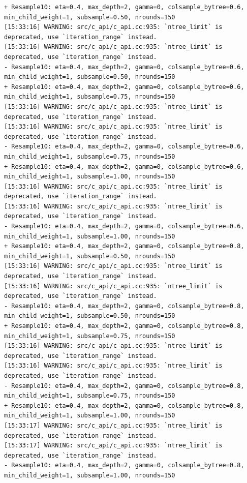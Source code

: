 \documentclass[
  letterpaper,
  DIV=11,
  numbers=noendperiod]{scrartcl}
\begin{document}
\begin{verbatim}
+ Resample10: eta=0.4, max_depth=2, gamma=0, colsample_bytree=0.6, min_child_weight=1, subsample=0.50, nrounds=150 
[15:33:16] WARNING: src/c_api/c_api.cc:935: `ntree_limit` is deprecated, use `iteration_range` instead.
[15:33:16] WARNING: src/c_api/c_api.cc:935: `ntree_limit` is deprecated, use `iteration_range` instead.
- Resample10: eta=0.4, max_depth=2, gamma=0, colsample_bytree=0.6, min_child_weight=1, subsample=0.50, nrounds=150 
+ Resample10: eta=0.4, max_depth=2, gamma=0, colsample_bytree=0.6, min_child_weight=1, subsample=0.75, nrounds=150 
[15:33:16] WARNING: src/c_api/c_api.cc:935: `ntree_limit` is deprecated, use `iteration_range` instead.
[15:33:16] WARNING: src/c_api/c_api.cc:935: `ntree_limit` is deprecated, use `iteration_range` instead.
- Resample10: eta=0.4, max_depth=2, gamma=0, colsample_bytree=0.6, min_child_weight=1, subsample=0.75, nrounds=150 
+ Resample10: eta=0.4, max_depth=2, gamma=0, colsample_bytree=0.6, min_child_weight=1, subsample=1.00, nrounds=150 
[15:33:16] WARNING: src/c_api/c_api.cc:935: `ntree_limit` is deprecated, use `iteration_range` instead.
[15:33:16] WARNING: src/c_api/c_api.cc:935: `ntree_limit` is deprecated, use `iteration_range` instead.
- Resample10: eta=0.4, max_depth=2, gamma=0, colsample_bytree=0.6, min_child_weight=1, subsample=1.00, nrounds=150 
+ Resample10: eta=0.4, max_depth=2, gamma=0, colsample_bytree=0.8, min_child_weight=1, subsample=0.50, nrounds=150 
[15:33:16] WARNING: src/c_api/c_api.cc:935: `ntree_limit` is deprecated, use `iteration_range` instead.
[15:33:16] WARNING: src/c_api/c_api.cc:935: `ntree_limit` is deprecated, use `iteration_range` instead.
- Resample10: eta=0.4, max_depth=2, gamma=0, colsample_bytree=0.8, min_child_weight=1, subsample=0.50, nrounds=150 
+ Resample10: eta=0.4, max_depth=2, gamma=0, colsample_bytree=0.8, min_child_weight=1, subsample=0.75, nrounds=150 
[15:33:16] WARNING: src/c_api/c_api.cc:935: `ntree_limit` is deprecated, use `iteration_range` instead.
[15:33:16] WARNING: src/c_api/c_api.cc:935: `ntree_limit` is deprecated, use `iteration_range` instead.
- Resample10: eta=0.4, max_depth=2, gamma=0, colsample_bytree=0.8, min_child_weight=1, subsample=0.75, nrounds=150 
+ Resample10: eta=0.4, max_depth=2, gamma=0, colsample_bytree=0.8, min_child_weight=1, subsample=1.00, nrounds=150 
[15:33:17] WARNING: src/c_api/c_api.cc:935: `ntree_limit` is deprecated, use `iteration_range` instead.
[15:33:17] WARNING: src/c_api/c_api.cc:935: `ntree_limit` is deprecated, use `iteration_range` instead.
- Resample10: eta=0.4, max_depth=2, gamma=0, colsample_bytree=0.8, min_child_weight=1, subsample=1.00, nrounds=150 

\end{verbatim}
\end{document}
